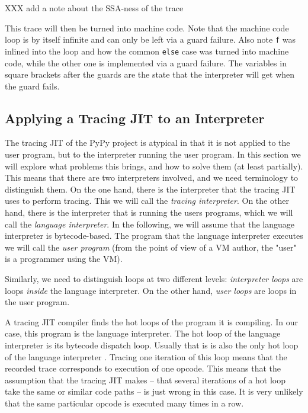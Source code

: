 \documentclass{acm_proc_article-sp}
\newcommand\arigo[1]{\nb{AR}{#1}}
\begin{document}
XXX add a note about the SSA-ness of the trace

This trace will then be turned into machine code. Note that the machine code
loop is by itself infinite and can only be left via a guard failure. Also note
\texttt{f} was inlined into the loop and how the common \texttt{else} case was
turned into machine code, while the other one is implemented via a guard
failure. The variables in square brackets after the guards are the state that
the interpreter will get when the guard fails.


\subsection{Applying a Tracing JIT to an Interpreter}

The tracing JIT of the PyPy project is atypical in that it is not applied to the
user program, but to the interpreter running the user program. In this section
we will explore what problems this brings, and how to solve them (at least
partially). This means that there are two interpreters involved, and we need
terminology to distinguish them. On the one hand, there is the interpreter that
the tracing JIT uses to perform tracing. This we will call the \emph{tracing
interpreter}. On the other hand, there is the interpreter that is running the
users programs, which we will call the \emph{language interpreter}. In the
following, we will assume that the language interpreter is bytecode-based. The
program that the language interpreter executes we will call the \emph{user
program} (from the point of view of a VM author, the "user" is a programmer
using the VM).

Similarly, we need to distinguish loops at two different levels:
\emph{interpreter loops} are loops \emph{inside} the language interpreter. On
the other hand, \emph{user loops} are loops in the user program.

A tracing JIT compiler finds the hot loops of the program it is compiling. In
our case, this program is the language interpreter. The hot loop of the language
interpreter is its bytecode dispatch loop. Usually that is is also the only hot
loop of the language interpreter \arigo{Uh?}.  Tracing one iteration of this loop means that
the recorded trace corresponds to execution of one opcode. This means that the
assumption that the tracing JIT makes -- that several iterations of a hot loop
take the same or similar code paths -- is just wrong in this case. It is very
unlikely that the same particular opcode is executed many times in a row.
\end{document}

